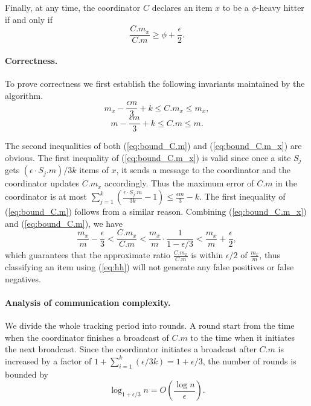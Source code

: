 \documentclass[10pt]{article}
\newcommand{\eps}{\epsilon}
\begin{document}
Finally, at any time, the coordinator $C$ declares an item $x$ to be a
$\phi$-heavy hitter if and only if
\begin{equation}
\label{eq:hh}
\frac{C.m_x}{C.m} \ge \phi + \frac{\eps}{2}.
\end{equation}


\paragraph{Correctness.}
To prove correctness we first establish the following invariants
maintained by the algorithm.
\begin{equation}
\label{eq:bound_C.m_x} m_x - \frac{\eps m}{3} + k \le C.{m_x} \le
m_x,
\end{equation}
\begin{equation}
\label{eq:bound_C.m} m - \frac{\eps m}{3} + k \le C.m \le m.
\end{equation}

The second inequalities of both (\ref{eq:bound_C.m}) and
(\ref{eq:bound_C.m_x}) are obvious. The first inequality of
(\ref{eq:bound_C.m_x}) is valid since once a site $S_j$ gets
$(\eps \cdot {S_j}.m)/3k$ items of $x$, it sends a message to the
coordinator and the coordinator updates $C.m_x$ accordingly. Thus
the maximum error of $C.m$ in the coordinator is at most
$\sum_{j=1}^k (\frac{\eps \cdot {S_j}.m}{3k}- 1) \le \frac{\eps
m}{3} - k$. The first inequality of (\ref{eq:bound_C.m}) follows
from a similar reason. Combining (\ref{eq:bound_C.m_x}) and
(\ref{eq:bound_C.m}), we have
$$\frac{m_x}{m} - \frac{\eps}{3} < \frac{C.m_x}{C.m} <
\frac{m_x}{m}\cdot\frac{1}{1-\eps/3} < \frac{m_x}{m} + \frac{\eps}{2},$$
which guarantees that the approximate ratio $\frac{C.m_x}{C.m}$ is within
$\eps/2$ of $\frac{m_x}{m}$, thus classifying an item using (\ref{eq:hh})
will not generate any false positives or false negatives.

\paragraph{Analysis of communication complexity.}
We divide the whole tracking period into rounds. A round start
from the time when the coordinator finishes a broadcast of $C.m$ to the
time when it initiates the next broadcast. Since the coordinator
initiates a broadcast after $C.m$ is increased by a factor of
$1+\sum_{i=1}^{k}(\eps/3k) = 1+\eps/3$, the number of rounds is
bounded by
$$\log_{1+\eps/3} n = O\left(\frac{\log n}{\eps}\right).$$
\end{document}

